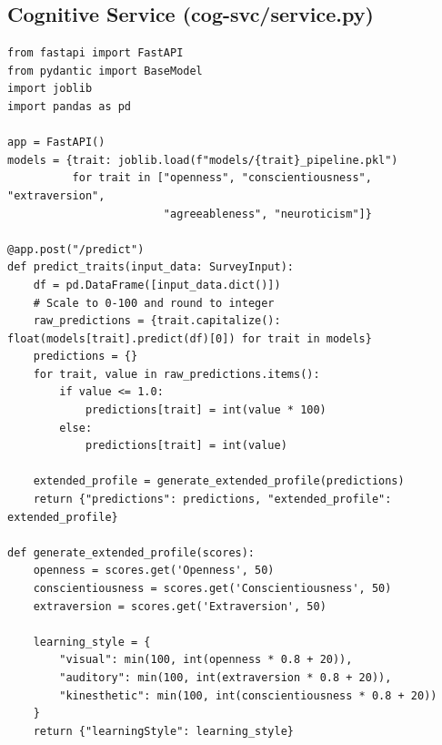 \documentclass[12pt,a4paper]{report}
\begin{document}
\subsection{Cognitive Service (cog-svc/service.py)}
\begin{footnotesize}
\begin{verbatim}
from fastapi import FastAPI
from pydantic import BaseModel
import joblib
import pandas as pd

app = FastAPI()
models = {trait: joblib.load(f"models/{trait}_pipeline.pkl") 
          for trait in ["openness", "conscientiousness", "extraversion", 
                        "agreeableness", "neuroticism"]}

@app.post("/predict")
def predict_traits(input_data: SurveyInput):
    df = pd.DataFrame([input_data.dict()])
    # Scale to 0-100 and round to integer
    raw_predictions = {trait.capitalize(): float(models[trait].predict(df)[0]) for trait in models}
    predictions = {}
    for trait, value in raw_predictions.items():
        if value <= 1.0:
            predictions[trait] = int(value * 100)
        else:
            predictions[trait] = int(value)
    
    extended_profile = generate_extended_profile(predictions)
    return {"predictions": predictions, "extended_profile": extended_profile}

def generate_extended_profile(scores):
    openness = scores.get('Openness', 50)
    conscientiousness = scores.get('Conscientiousness', 50)
    extraversion = scores.get('Extraversion', 50)
    
    learning_style = {
        "visual": min(100, int(openness * 0.8 + 20)),
        "auditory": min(100, int(extraversion * 0.8 + 20)),
        "kinesthetic": min(100, int(conscientiousness * 0.8 + 20))
    }
    return {"learningStyle": learning_style}
\end{verbatim}
\end{footnotesize}
\end{document}
